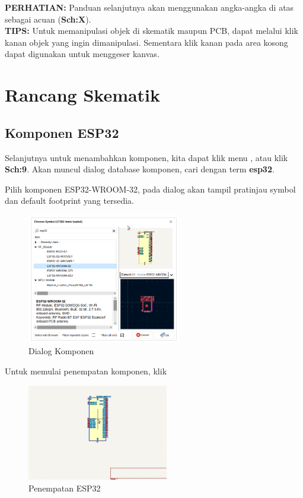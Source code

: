 \documentclass[12pt]{book}
\begin{document}
	\textbf{PERHATIAN:} Panduan selanjutnya akan menggunakan angka-angka di atas sebagai acuan (\textbf{Sch:X}).\\

	\textbf{TIPS:} Untuk memanipulasi objek di skematik maupun PCB, dapat melalui klik kanan objek yang ingin dimanipulasi.
	Sementara klik kanan pada area kosong dapat digunakan untuk menggeser kanvas.

	\newpage
	\section{Rancang Skematik}

	\subsection{Komponen ESP32}

	Selanjutnya untuk menambahkan komponen, kita dapat klik menu , atau klik \textbf{Sch:9}.
	Akan muncul dialog database komponen, cari dengan term \textbf{esp32}.

	Pilih komponen ESP32-WROOM-32, pada dialog akan tampil pratinjau symbol dan default footprint yang tersedia.
	\begin{figure}[!ht]
		\centering
		\includegraphics[width=0.6\textwidth]{images/sch/sch_2}
		\caption{Dialog Komponen}
	\end{figure}

	Untuk memulai penempatan komponen, klik 

	\begin{figure}[!ht]
		\centering
		\includegraphics[width=0.55\textwidth]{images/sch/sch_3}
		\caption{Penempatan ESP32}
	\end{figure}
\end{document}
